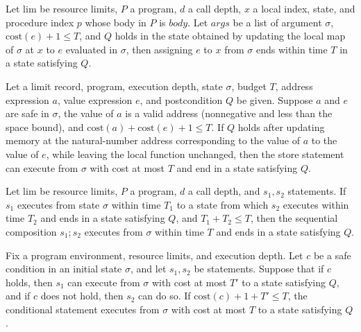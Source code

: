 \begin{theorem}
\label{Light.Ends.set}
\leanok
{}
Let $\mathrm{lim}$ be resource limits, $P$ a program, $d$ a call depth, $x$ a local index,
state, and procedure index $p$ whose body in $P$ is $body$. Let $args$ be a list of argument
$\sigma$, $\mathrm{cost}(e)+1\le T$, and $Q$ holds in the state obtained by updating the
local map of $\sigma$ at $x$ to $e$ evaluated in $\sigma$, then assigning $e$ to $x$
from $\sigma$ ends within time $T$ in a state satisfying $Q$.
\end{theorem}

\begin{theorem}
\label{Light.Ends.store}
\leanok
{}
Let a limit record, program, execution depth, state $\sigma$, budget $T$, address
expression $a$, value expression $e$, and postcondition $Q$ be given. Suppose $a$ and
$e$ are safe in $\sigma$, the value of $a$ is a valid address (nonnegative and less than
the space bound), and $\mathrm{cost}(a)+\mathrm{cost}(e)+1\le T$. If $Q$ holds after
updating memory at the natural-number address corresponding to the value of $a$ to the
value of $e$, while leaving the local function unchanged, then the store statement can
execute from $\sigma$ with cost at most $T$ and end in a state satisfying $Q$.
\end{theorem}

\begin{theorem}
\label{Light.Ends.seq}
\leanok
{}
Let $\mathrm{lim}$ be resource limits, $P$ a program, $d$ a call depth, and $s_1,s_2$
statements. If $s_1$ executes from state $\sigma$ within time $T_1$ to a state from which
$s_2$ executes within time $T_2$ and ends in a state satisfying $Q$, and $T_1+T_2\le T$,
then the sequential composition $s_1;s_2$ executes from $\sigma$ within time $T$ and ends
in a state satisfying $Q$.
\end{theorem}

\begin{theorem}
\label{Light.Ends.ite}
\leanok
{}
Fix a program environment, resource limits, and execution depth. Let $c$ be a safe
condition in an initial state $\sigma$, and let $s_1,s_2$ be statements. Suppose that if
$c$ holds, then $s_1$ can execute from $\sigma$ with cost at most $T'$ to a state
satisfying $Q$, and if $c$ does not hold, then $s_2$ can do so. If
$\mathrm{cost}(c)+1+T'\le T$, the conditional statement executes from $\sigma$ with cost
at most $T$ to a state satisfying $Q$.
\end{theorem}

